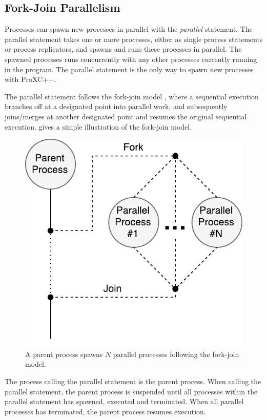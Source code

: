 \subsection{Fork\hyp{}Join Parallelism}
\label{subsec:fork_join_parallelism}


Processes can spawn new processes in parallel with the \textit{parallel} statement. The parallel statement takes one or more processes, either as single process statements or process replicators, and spawns and runs these processes in parallel. The spawned processes runs concurrently with any other processes currently running in the program. The parallel statement is the only way to spawn new processes with ProXC++.

The parallel statement follows the fork\hyp{}join model \citep[page 88]{mccool2012structured}, where a sequential execution branches off at a designated point into parallel work, and subsequently joins/merges at another designated point and resumes the original sequential execution.  gives a simple illustration of the fork\hyp{}join model.

\begin{figure}[h!]
    \centering
    \includegraphics[width=0.6\linewidth]{fig/fork_join}
    \caption{A parent process spawns $N$ parallel processes following the fork\hyp{}join model.}
    \label{fig:fork_join_model}
\end{figure}

The process calling the parallel statement is the parent process. When calling the parallel statement, the parent process is suspended until all processes within the parallel statement has spawned, executed and terminated. When all parallel processes has terminated, the parent process resumes execution. 

